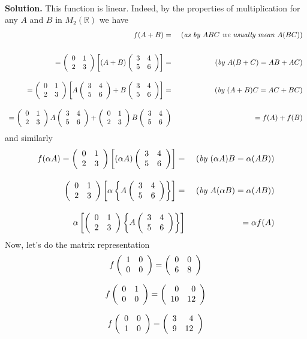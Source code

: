 \documentclass[12pt,fleqn]{article} %
\begin{document}
\begin{enumerate}
	\\\textbf{Solution.} 
	This function is linear. Indeed, by the properties of multiplication for any $A$ and $B$ in $M_2(\mathbb{R})$ we have
	\[\begin{array}{rr}f(A+B)=&\mbox{ (\textit{as by $ABC$ we usually mean $A(BC)$})}\\[2em]
	=\left(\begin{array}{rr}0&1\\2&3\end{array}\right)\left[(A+B)\left(\begin{array}{rr}3&4\\5&6\end{array}\right)\right]=&\mbox{ (\textit{by $A(B+C)=AB+AC$})}\\[2em]
	=\left(\begin{array}{rr}0&1\\2&3\end{array}\right)\left[A\left(\begin{array}{rr}3&4\\5&6\end{array}\right)+B\left(\begin{array}{rr}3&4\\5&6\end{array}\right)\right]=&\mbox{ (\textit{by $(A+B)C=AC+BC$})}\\[2em]
	=\left(\begin{array}{rr}0&1\\2&3\end{array}\right)A\left(\begin{array}{rr}3&4\\5&6\end{array}\right)+\left(\begin{array}{rr}0&1\\2&3\end{array}\right)B\left(\begin{array}{rr}3&4\\5&6\end{array}\right)&=
	f(A)+f(B)\end{array}\]
	and similarly
	\[\begin{array}{rr}
	f(\alpha A)=\left(\begin{array}{rr}0&1\\2&3\end{array}\right)\left[(\alpha A)\left(\begin{array}{rr}3&4\\5&6\end{array}\right)\right]=&\mbox{ (\textit{by $(\alpha A)B=\alpha(AB)$})}\\[2em]
	\left(\begin{array}{rr}0&1\\2&3\end{array}\right)\left[\alpha \left\{A\left(\begin{array}{rr}3&4\\5&6\end{array}\right)\right\}\right]=&\mbox{ (\textit{by $A(\alpha B)=\alpha(AB)$})}\\[2em]
	\alpha\left[\left(\begin{array}{rr}0&1\\2&3\end{array}\right){\left\{A\left(\begin{array}{rr}3&4\\5&6\end{array}\right)\right\}}\right]&=\alpha f(A)
	\end{array}\]
	Now, let's do the matrix representation
	\[f\left(\begin{array}{rr}1&0\\0&0\end{array}\right)=
	\left(\begin{array}{rr}
	0&0\\
	6&8\\\end{array}\right)\]

	\[f\left(\begin{array}{rr}0&1\\0&0\end{array}\right)=
\left(\begin{array}{rr}
0&0\\
10&12\\
\end{array}\right)\]

	\[f\left(\begin{array}{rr}0&0\\1&0\end{array}\right)=
\left(\begin{array}{rr}
3&4\\
9&12\\
\end{array}\right)\]


\end{enumerate}
\end{document}
